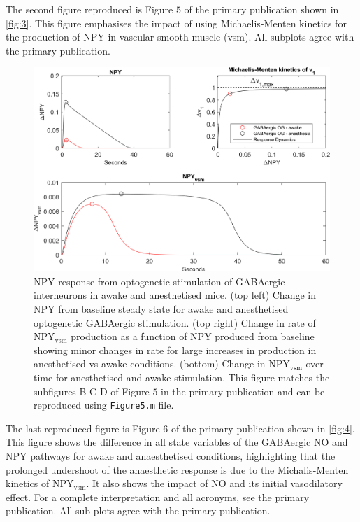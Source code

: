 \documentclass[fleqn,10pt]{physiome}
\begin{document}
The second figure reproduced is Figure $5$ of the primary publication shown in \autoref{fig:3}. This figure emphasises the impact of using Michaelis-Menten kinetics for the production of NPY in vascular smooth muscle (vsm). All subplots agree with the primary publication. 

\begin{figure}[htbp]
    \centering
    \includegraphics[scale=0.8, keepaspectratio]{Figure5.png}
    \caption{NPY response from optogenetic stimulation of GABAergic interneurons in awake and anesthetised mice. (top left) Change in NPY from baseline steady state for awake and anesthetised optogenetic GABAergic stimulation. (top right) Change in rate of NPY$_\mathrm{vsm}$ production as a function of NPY produced from baseline showing minor changes in rate for large increases in production in anesthetised vs awake conditions. (bottom) Change in NPY$_\mathrm{vsm}$ over time for anesthetised and awake stimulation. This figure matches the subfigures B-C-D of Figure $5$ in the primary publication and can be reproduced using \texttt{Figure5.m} file.}
    \label{fig:3}
\end{figure}

The last reproduced figure is Figure $6$ of the primary publication shown in \autoref{fig:4}. This figure shows the difference in all state variables of the GABAergic NO and NPY pathways for awake and anaesthetised conditions, highlighting that the prolonged undershoot of the anaesthetic response is due to the Michalis-Menten kinetics of NPY$_\mathrm{vsm}$. It also shows the impact of NO and its initial vasodilatory effect. For a complete interpretation and all acronyms, see the primary publication. All sub-plots agree with the primary publication. 
\end{document}
